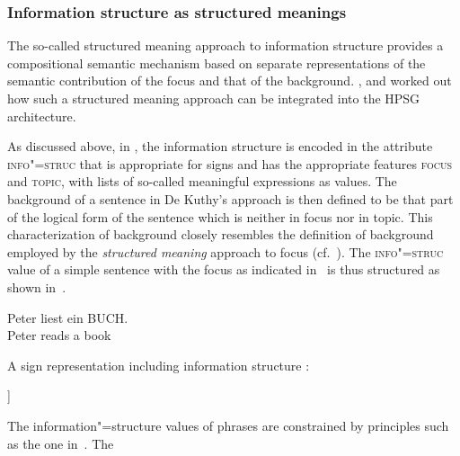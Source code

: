 \documentclass[output=paper]{langsci/langscibook}
\begin{document}
\subsubsection{Information structure as structured meanings \citep{deKuthy2002a}}
\label{sec:struc-meaning}
The so-called structured meaning approach
\citep{Stechow81a-u,Jacobs83a,Krifka92a-u-kopiert} to information
structure provides a compositional semantic mechanism based on
separate representations of the semantic contribution of the focus and
that of the background. \citet{deKuthy2002a}, \cite{dKM2003a} and
\cite{Webelhuth2007a-u} worked out how such a structured meaning
approach can be integrated into the HPSG architecture.

As discussed above, in \cite{deKuthy2002a}, the information structure
is encoded in the attribute \textsc{info"=struc} that is appropriate
for signs and has the appropriate features \textsc{focus} and
\textsc{topic}, with lists of so-called meaningful expressions as
values. The background of a sentence in De Kuthy's approach is then defined
to be that part of the logical form of the sentence which is neither
in focus nor in topic.  This characterization of background closely
resembles the definition of background employed by the 
\textit{structured meaning} approach to focus (cf.\ \citealt{Krifka92a-u-kopiert}).
The \textsc{info"=struc} value of a simple sentence with the focus as
indicated in~ is thus structured as shown in~.
\begin{exe}
  \ex\label{ex:peter} \gll Peter {\LF}liest ein BUCH{\RF}.\\
           Peter {}reads a book\\
\end{exe}
\ea
 A sign representation including information structure \citep[163]{deKuthy2002a}:
\begin{center}
    \begin{avm}
      [s|loc|cont|lf  $\exists x \[book'\(x\) \wedge read'\(p,x\)\]$\\
       info-struc  [focus & \XlstI{$\lambda y \exists x\[book'\(x\) \wedge read'\(y,x\)\]$}\\
                     topic & \elst]
      ]
    \end{avm}

    \label{fig:focus-backgr}
  \end{center}\unskip
\z
The information"=structure values of phrases are constrained by
principles such as the one in~. The
\end{document}
